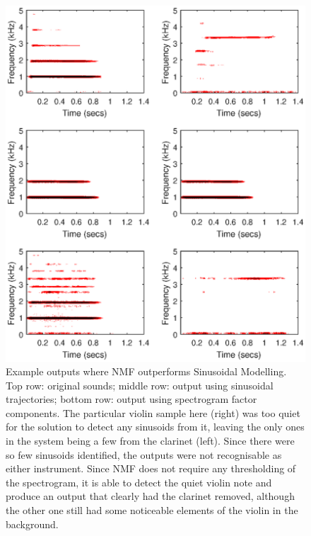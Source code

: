 \documentclass[12pt,a4paper,twoside,openright]{report}
\begin{document}
\begin{figure}
\centering
\includegraphics[width=0.7\linewidth]{../OutputSpectrograms/sinNMFcompSpec2}
\caption[Example outputs where NMF outperforms Sinusoidal Modelling.]{Example outputs where NMF outperforms Sinusoidal Modelling. Top row: original sounds; middle row: output using sinusoidal trajectories; bottom row: output using spectrogram factor components. The particular violin sample here (right) was too quiet for the solution to detect any sinusoids from it, leaving the only ones in the system being a few from the clarinet (left). Since there were so few sinusoids identified, the outputs were not recognisable as either instrument. Since NMF does not require any thresholding of the spectrogram, it is able to detect the quiet violin note and produce an output that clearly had the clarinet removed, although the other one still had some noticeable elements of the violin in the background.}
\label{fig:sinNMFcompSpec2}
\end{figure}

\end{document}
